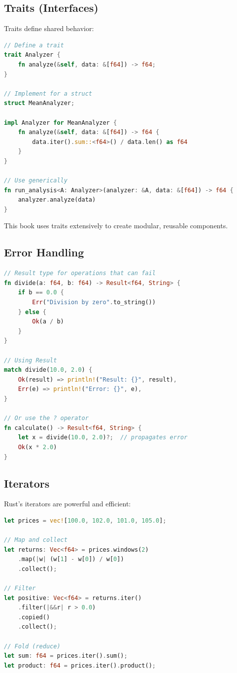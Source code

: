 \subsection{Traits (Interfaces)}


Traits define shared behavior:

\begin{lstlisting}[language=Rust]
// Define a trait
trait Analyzer {
    fn analyze(&self, data: &[f64]) -> f64;
}

// Implement for a struct
struct MeanAnalyzer;

impl Analyzer for MeanAnalyzer {
    fn analyze(&self, data: &[f64]) -> f64 {
        data.iter().sum::<f64>() / data.len() as f64
    }
}

// Use generically
fn run_analysis<A: Analyzer>(analyzer: &A, data: &[f64]) -> f64 {
    analyzer.analyze(data)
}
\end{lstlisting}

This book uses traits extensively to create modular, reusable components.

\subsection{Error Handling}

\begin{lstlisting}[language=Rust]
// Result type for operations that can fail
fn divide(a: f64, b: f64) -> Result<f64, String> {
    if b == 0.0 {
        Err("Division by zero".to_string())
    } else {
        Ok(a / b)
    }
}

// Using Result
match divide(10.0, 2.0) {
    Ok(result) => println!("Result: {}", result),
    Err(e) => println!("Error: {}", e),
}

// Or use the ? operator
fn calculate() -> Result<f64, String> {
    let x = divide(10.0, 2.0)?;  // propagates error
    Ok(x * 2.0)
}
\end{lstlisting}

\subsection{Iterators}

Rust's iterators are powerful and efficient:

\begin{lstlisting}[language=Rust]
let prices = vec![100.0, 102.0, 101.0, 105.0];

// Map and collect
let returns: Vec<f64> = prices.windows(2)
    .map(|w| (w[1] - w[0]) / w[0])
    .collect();

// Filter
let positive: Vec<f64> = returns.iter()
    .filter(|&&r| r > 0.0)
    .copied()
    .collect();

// Fold (reduce)
let sum: f64 = prices.iter().sum();
let product: f64 = prices.iter().product();
\end{lstlisting}

